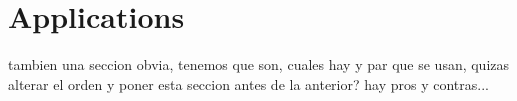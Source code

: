 

\section{Applications}\label{sec:kgs-applications}

tambien una seccion obvia, tenemos que son, cuales hay y par que se usan, quizas alterar el orden y poner esta seccion antes de la anterior? hay pros y contras...



    
